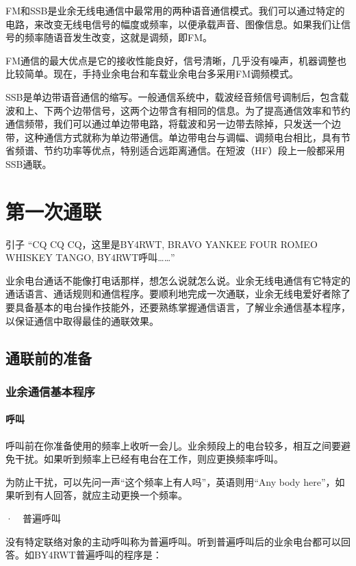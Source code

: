 \documentclass[12pt,UTF8]{ctexbook}
\begin{document}
FM和SSB是业余无线电通信中最常用的两种语音通信模式。我们可以通过特定的电路，来改变无线电信号的幅度或频率，以便承载声音、图像信息。如果我们让信号的频率随语音发生改变，这就是调频，即FM。

FM通信的最大优点是它的接收性能良好，信号清晰，几乎没有噪声，机器调整也比较简单。现在，手持业余电台和车载业余电台多采用FM调频模式。

SSB是单边带语音通信的缩写。一般通信系统中，载波经音频信号调制后，包含载波和上、下两个边带信号，这两个边带含有相同的信息。为了提高通信效率和节约通信频带，我们可以通过单边带电路，将载波和另一边带去除掉，只发送一个边带，这种通信方式就称为单边带通信。单边带电台与调幅、调频电台相比，具有节省频谱、节约功率等优点，特别适合远距离通信。在短波（HF）段上一般都采用SSB通联。

\chapter{第一次通联}

引子
“CQ CQ CQ，这里是BY4RWT, BRAVO YANKEE FOUR ROMEO WHISKEY TANGO, BY4RWT呼叫……”

业余电台通话不能像打电话那样，想怎么说就怎么说。业余无线电通信有它特定的通话语言、通话规则和通信程序。要顺利地完成一次通联，业余无线电爱好者除了要具备基本的电台操作技能外，还要熟练掌握通信语言，了解业余通信基本程序，以保证通信中取得最佳的通联效果。

\section{通联前的准备}

\subsection{业余通信基本程序}

\subsubsection{呼叫}

呼叫前在你准备使用的频率上收听一会儿。业余频段上的电台较多，相互之间要避免干扰。如果听到频率上已经有电台在工作，则应更换频率呼叫。

为防止干扰，可以先问一声“这个频率上有人吗”，英语则用“Any body here”，如果听到有人回答，就应主动更换一个频率。

·　普遍呼叫

没有特定联络对象的主动呼叫称为普遍呼叫。听到普遍呼叫后的业余电台都可以回答。如BY4RWT普遍呼叫的程序是：
\end{document}
